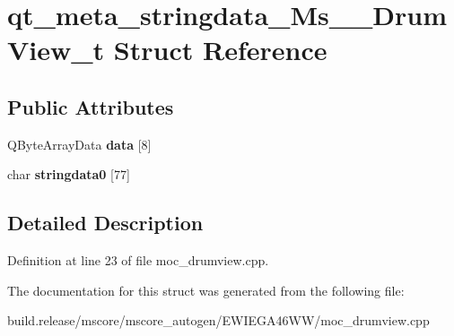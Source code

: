 \hypertarget{structqt__meta__stringdata___ms_____drum_view__t}{}\section{qt\+\_\+meta\+\_\+stringdata\+\_\+\+Ms\+\_\+\+\_\+\+Drum\+View\+\_\+t Struct Reference}
\label{structqt__meta__stringdata___ms_____drum_view__t}
\subsection*{Public Attributes}
\begin{DoxyCompactItemize}
\item 
\mbox{\label{structqt__meta__stringdata___ms_____drum_view__t_adbe5d86be9016e6b0894e2c34662ab1d}} 
Q\+Byte\+Array\+Data {\bfseries data} \mbox{[}8\mbox{]}
\item 
\mbox{\label{structqt__meta__stringdata___ms_____drum_view__t_ac59a8eb9e57dd5e33607089f43fa67df}} 
char {\bfseries stringdata0} \mbox{[}77\mbox{]}
\end{DoxyCompactItemize}


\subsection{Detailed Description}


Definition at line 23 of file moc\+\_\+drumview.\+cpp.



The documentation for this struct was generated from the following file\+:\begin{DoxyCompactItemize}
\item 
build.\+release/mscore/mscore\+\_\+autogen/\+E\+W\+I\+E\+G\+A46\+W\+W/moc\+\_\+drumview.\+cpp\end{DoxyCompactItemize}
